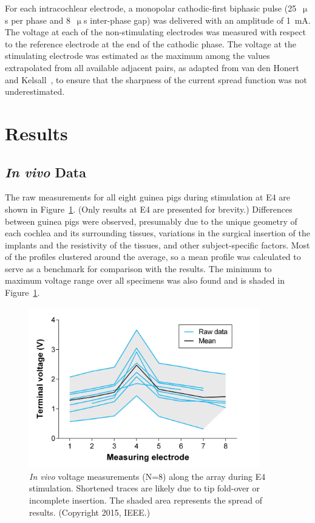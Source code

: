 For each intracochlear electrode, a monopolar cathodic-first biphasic pulse
(25~$ \upmu $s per phase and 8~$ \upmu $s inter-phase gap) was delivered with an
amplitude of 1~mA. The voltage at each of the non-stimulating electrodes was
measured with respect to the reference electrode at the end of the cathodic
phase. The voltage at the stimulating electrode was estimated as the maximum
among the values extrapolated from all available adjacent pairs, as adapted from
van den Honert and Kelsall~\cite{vandenhonert2007}, to ensure that the sharpness
of the current spread function was not underestimated.

\section{Results}

\subsection{\textit{In vivo} Data}

The raw measurements for all eight guinea pigs during stimulation at E4 are
shown in Figure~\ref{fig:in_vivo_data}. (Only results at E4 are presented for
brevity.) Differences between guinea pigs were observed, presumably due to the
unique geometry of each cochlea and its surrounding tissues, variations in the
surgical insertion of the implants and the resistivity of the tissues, and other
subject-specific factors. Most of the profiles clustered around the average, so
a mean profile was calculated to serve as a benchmark for comparison with the
\insilico{} results. The minimum to maximum voltage range over all specimens was
also found and is shaded in Figure~\ref{fig:in_vivo_data}.

\begin{figure}[p]
	\centering
	\includegraphics[height=7cm]{Validation/in_vivo_shefin}
	\caption[\textit{In vivo} voltage measurements along the array]{\textit{In
	vivo} voltage measurements (N=8) along the array during E4 stimulation.
	Shortened traces are likely due to tip fold-over or incomplete insertion. The
	shaded area represents the spread of \invivo{} results. (Copyright
	\textcopyright{} 2015, IEEE.)}
	\label{fig:in_vivo_data}
\end{figure}

